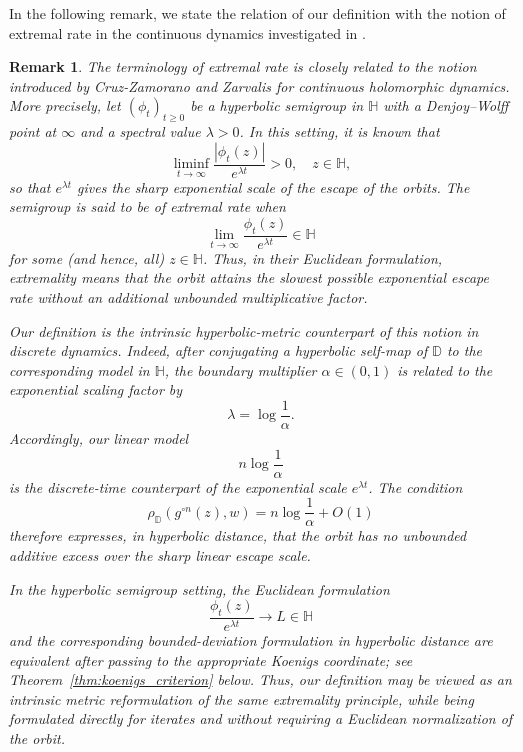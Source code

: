 \documentclass[10pt,a4paper]{amsart}
\numberwithin{equation}{section}
\newtheorem{remark}[equation]{Remark}
\begin{document}
In the following remark, we state the relation of our definition with the notion of extremal rate in the continuous dynamics investigated in \cite{cruz26}.
\begin{remark}
\label{rem:continuous_extremal_rate}
The terminology of extremal rate is closely related to the notion introduced by Cruz-Zamorano and Zarvalis
\cite[Section~3.1]{cruz26} for continuous holomorphic dynamics.
More precisely, let $(\phi_t)_{t\geq0}$ be a hyperbolic semigroup in
$\mathbb{H}$ with a Denjoy--Wolff point at $\infty$ and a spectral value
$\lambda>0$. In this setting, it is known that
\begin{equation*}
\liminf_{t\to\infty}
\frac{|\phi_t(z)|}{e^{\lambda t}}>0,
\quad z\in\mathbb{H},
\end{equation*}
so that $e^{\lambda t}$ gives the sharp exponential scale of the escape of the orbits. The semigroup is said to be of extremal rate
when
\begin{equation*}
\lim_{t\to\infty}
\frac{\phi_t(z)}{e^{\lambda t}}
\in\mathbb{H}
\end{equation*}
for some (and hence, all) $z\in\mathbb{H}$.
Thus, in their Euclidean formulation, extremality means that the
orbit attains the slowest possible exponential escape rate without
an additional unbounded multiplicative factor.

Our definition is the intrinsic hyperbolic-metric counterpart of
this notion in discrete dynamics. Indeed, after conjugating a
hyperbolic self-map of $\mathbb{D}$ to the corresponding model in
$\mathbb{H}$, the boundary multiplier $\alpha\in(0,1)$ is related to
the exponential scaling factor by
\begin{equation*}
\lambda=\log\frac{1}{\alpha}.
\end{equation*}
Accordingly, our linear model
\begin{equation*}
n\log\frac{1}{\alpha}
\end{equation*}
is the discrete-time counterpart of the exponential scale
$e^{\lambda t}$. The condition
\begin{equation*}
\rho_{\mathbb{D}}(g^{\circ n}(z),w)
=
n\log\frac{1}{\alpha}+O(1)
\end{equation*}
therefore expresses, in hyperbolic distance, that the orbit has no
unbounded additive excess over the sharp linear escape scale.

In the hyperbolic semigroup setting, the Euclidean formulation
\begin{equation*}
\frac{\phi_t(z)}{e^{\lambda t}}\longrightarrow L\in\mathbb{H}
\end{equation*}
and the corresponding bounded-deviation formulation in hyperbolic distance are equivalent after passing to the appropriate Koenigs
coordinate; see Theorem~\ref{thm:koenigs_criterion} below. Thus, our definition may be viewed as an intrinsic metric reformulation of the
same extremality principle, while being formulated directly for
iterates and without requiring a Euclidean normalization of the
orbit.
\end{remark}
\end{document}
